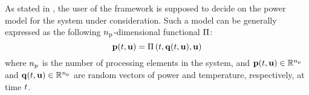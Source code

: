 As stated in , the user of the framework is supposed
to decide on the power model for the system under consideration. Such a model
can be generally expressed as the following ${n_\text{p}}$-dimensional functional
$\oPower$:
\begin{equation} \elabel{power-model}
  \vP(\t, \vU) = \oPower{\t, \vTO(\t, \vU), \vU}
\end{equation}
where ${n_\text{p}}$ is the number of processing elements in the system, and $\mathbf{p}(t,
\mathbf{u}) \in \mathbb{R}^{n_\text{p}}$ and $\mathbf{q}(t, \mathbf{u}) \in \mathbb{R}^{n_\text{p}}$ are random vectors
of power and temperature, respectively, at time $t$.

